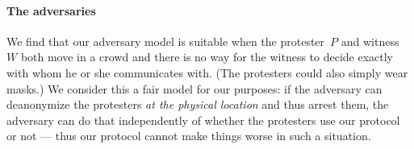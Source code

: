 


%
%
%

\paragraph*{The adversaries}

We find that our adversary model is suitable when the protester~\(P\) and 
witness~\(W\) both move in a crowd and there is no way for the witness to 
decide exactly with whom he or she communicates with.
(The protesters could also simply wear masks.)
We consider this a fair model for our purposes: if the adversary can 
deanonymize the protesters \emph{at the physical location} and thus arrest 
them, the adversary can do that independently of whether the protesters use our 
protocol or not --- thus our protocol cannot make things worse in such a 
situation.

